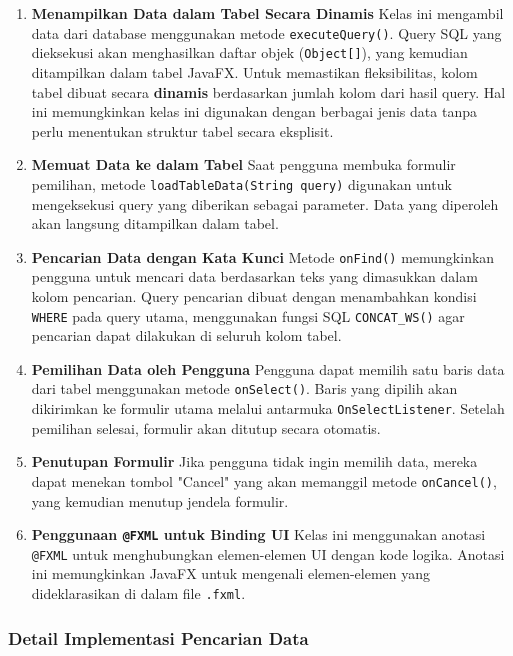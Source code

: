\begin{enumerate}
	\item \textbf{Menampilkan Data dalam Tabel Secara Dinamis}  
	Kelas ini mengambil data dari database menggunakan metode \texttt{executeQuery()}. Query SQL yang dieksekusi akan menghasilkan daftar objek (\texttt{Object[]}), yang kemudian ditampilkan dalam tabel JavaFX.  
	Untuk memastikan fleksibilitas, kolom tabel dibuat secara \textbf{dinamis} berdasarkan jumlah kolom dari hasil query. Hal ini memungkinkan kelas ini digunakan dengan berbagai jenis data tanpa perlu menentukan struktur tabel secara eksplisit.
	
	\item \textbf{Memuat Data ke dalam Tabel}  
	Saat pengguna membuka formulir pemilihan, metode \texttt{loadTableData(String query)} digunakan untuk mengeksekusi query yang diberikan sebagai parameter. Data yang diperoleh akan langsung ditampilkan dalam tabel.
	
	\item \textbf{Pencarian Data dengan Kata Kunci}  
	Metode \texttt{onFind()} memungkinkan pengguna untuk mencari data berdasarkan teks yang dimasukkan dalam kolom pencarian. Query pencarian dibuat dengan menambahkan kondisi \texttt{WHERE} pada query utama, menggunakan fungsi SQL \texttt{CONCAT\_WS()} agar pencarian dapat dilakukan di seluruh kolom tabel.
	
	\item \textbf{Pemilihan Data oleh Pengguna}  
	Pengguna dapat memilih satu baris data dari tabel menggunakan metode \texttt{onSelect()}. Baris yang dipilih akan dikirimkan ke formulir utama melalui antarmuka \texttt{OnSelectListener}. Setelah pemilihan selesai, formulir akan ditutup secara otomatis.
	
	\item \textbf{Penutupan Formulir}  
	Jika pengguna tidak ingin memilih data, mereka dapat menekan tombol "Cancel" yang akan memanggil metode \texttt{onCancel()}, yang kemudian menutup jendela formulir.
	
	\item \textbf{Penggunaan \texttt{@FXML} untuk Binding UI}  
	Kelas ini menggunakan anotasi \texttt{@FXML} untuk menghubungkan elemen-elemen UI dengan kode logika. Anotasi ini memungkinkan JavaFX untuk mengenali elemen-elemen yang dideklarasikan di dalam file \texttt{.fxml}.
	
\end{enumerate}

\subsubsection{Detail Implementasi Pencarian Data}

